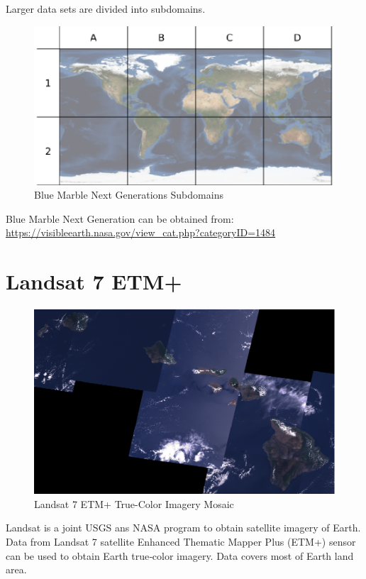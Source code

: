 Larger data sets are divided into subdomains.

\begin{figure}[h!]
  \centering
  \includegraphics[width=140mm]{images/bmng_subdomains.eps}
  \caption{Blue Marble Next Generations Subdomains}
\end{figure}

Blue Marble Next Generation can be obtained from: \cite{Terrain-VisibleEarthBMNG} \\
\url{https://visibleearth.nasa.gov/view_cat.php?categoryID=1484}

\section{Landsat 7 ETM+}

\begin{figure}[h!]
  \centering
  \includegraphics[width=120mm]{images/landsat_7_etm_hawaii.eps}
  \caption{Landsat 7 ETM+ True-Color Imagery Mosaic}
\end{figure}

Landsat is a joint USGS ans NASA program to obtain satellite imagery of Earth. Data from Landsat 7 satellite Enhanced Thematic Mapper Plus (ETM+) sensor can be used to obtain Earth true‑color imagery. Data covers most of Earth land area.


